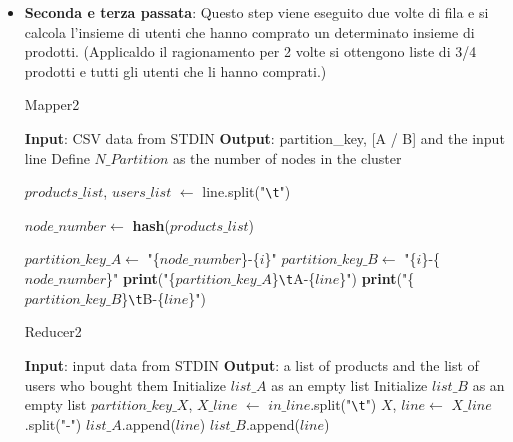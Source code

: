 \begin{itemize}
\newpage

    \item \textbf{Seconda e terza passata}: Questo step viene eseguito due volte di fila e si calcola l'insieme di utenti che hanno comprato un determinato insieme di prodotti. (Applicaldo il ragionamento per 2 volte si ottengono liste di 3/4 prodotti e tutti gli utenti che li hanno comprati.)

      \begin{algorithm}[!ht]
    \caption{Mapper2}
      \begin{algorithmic}[1]
        \STATE \textbf{Input}: CSV data from STDIN
        \STATE \textbf{Output}: partition\_key, [A / B] and the input line
        \STATE Define $N\_Partition$ as the number of nodes in the cluster
        
        \STATE $products\_list$, $users\_list$ $\gets$ line.split("\texttt{\textbackslash t}")

            \STATE $node\_number \gets$ \textbf{hash}($products\_list$)

                \STATE $partition\_key\_A \gets$ "\{$node\_number$\}-\{$i$\}"
                \STATE $partition\_key\_B \gets$ "\{$i$\}-\{$node\_number$\}"
                \STATE \textbf{print}("\{$partition\_key\_A$\}\texttt{\textbackslash t}A-\{$line$\}")
                \STATE \textbf{print}("\{$partition\_key\_B$\}\texttt{\textbackslash t}B-\{$line$\}")
            \ENDFOR
            
        \ENDIF
        
       \ENDFOR
      \end{algorithmic}
    \end{algorithm}

    \begin{algorithm}[!ht]
      \caption{Reducer2}
      \begin{algorithmic}[1]
      \STATE \textbf{Input}: input data from STDIN
      \STATE \textbf{Output}: a list of products and the list of users who bought them
      \STATE Initialize $list\_A$ as an empty list
      \STATE Initialize $list\_B$ as an empty list
        \STATE $partition\_key\_X$, $X\_line$ $\gets$ $in\_line$.split("\texttt{\textbackslash t}")
        \STATE $X$, $line \gets$ $X\_line$.split("-")
            \STATE $list\_A$.append($line$)
        \ELSE
            \STATE $list\_B$.append($line$)
        \ENDIF
      \ENDFOR
      

\end{algorithmic}
\end{algorithm}
\end{itemize}

